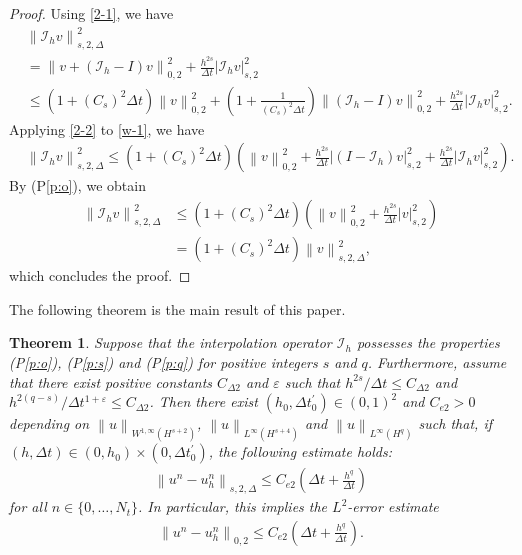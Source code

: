 \documentclass[10pt,a4paper,tbtags,leqno]{amsart}
\newtheorem{theorem}{Theorem}[section]
\theoremstyle{definition}
\numberwithin{equation}{section}
\def\norm#1#2{\left\|#2\right\|_{#1}}
\def\snorm#1#2{\left|#2\right|_{#1}}
\begin{document}
\begin{proof} 
  Using \eqref{2-1}, we have 
  \begin{align} 
    & \norm{s, 2, \Delta}{\mathcal{I}_{h} v}^2 \\ & = \norm{0, 2}{v + (\mathcal{I}_{h} - I) v}^2 + \frac{h^{2s}}{\Delta t} \snorm{s, 2}{\mathcal{I}_{h} v}^2 \\ 
    & \leq (1 + (C_s)^2 \Delta t) \norm{0, 2}{v}^2 + \left(1 + \frac{1}{(C_s)^2 \Delta t}\right) \norm{0, 2}{(\mathcal{I}_{h} - I) v}^2 + \frac{h^{2s}}{\Delta t} \snorm{s, 2}{\mathcal{I}_{h} v}^2. \label{w-1} 
  \end{align} 
  Applying \eqref{2-2} to \eqref{w-1}, we have 
  \begin{align} 
    & \norm{s, 2, \Delta}{\mathcal{I}_{h} v}^2 \leq (1 + (C_s)^2 \Delta t)\left(\norm{0, 2}{v}^2 + \frac{h^{2s}}{\Delta t} \snorm{s, 2}{(I - \mathcal{I}_{h})v}^2 + \frac{h^{2s}}{\Delta t} \snorm{s, 2}{\mathcal{I}_{h} v}^2\right). 
  \end{align} 
  By (P\ref{p:o}), we obtain 
  \begin{align} 
    \norm{s, 2, \Delta}{\mathcal{I}_{h} v}^2 & \leq (1 + (C_s)^2 \Delta t) \left(\norm{0, 2}{v}^2 + \frac{h^{2s}}{\Delta t} \snorm{s, 2}{v}^2\right) \\ & = (1 + (C_s)^2 \Delta t)  \norm{s, 2, \Delta}{v}^2, 
  \end{align}
  which concludes the proof. 
\end{proof} 

The following theorem is the main result of this paper. 

\begin{theorem} \label{thm:2} 
  Suppose that the interpolation operator $ \mathcal{I}_{h} $ possesses the properties (P\ref{p:o}), (P\ref{p:s}) and (P\ref{p:q}) for positive integers $ s $ and $ q $. 
  Furthermore, assume that there exist positive constants $ C_{\Delta 2} $ and $ \varepsilon $ such that $ h^{2s} / \Delta t \leq C_{\Delta 2} $ and $ h^{2(q - s)} / \Delta t^{1 + \varepsilon} \leq C_{\Delta 2} $. Then there exist $ (h_0, \Delta t_0^\prime) \in (0, 1)^2 $ and $ C_{e2} > 0 $ depending on $ \norm{W^{1,\infty}(H^{s + 2})}{u} $, $ \norm{L^{\infty} (H^{s + 4})}{u} $ and $ \norm{L^{\infty}(H^{q})}{u} $ such that, if $ (h, \Delta t) \in (0, h_0) \times (0, \Delta t_0^\prime) $, the following estimate holds: 
  \begin{align} 
    \norm{s, 2, \Delta}{u^n - u_h^n} \leq C_{e2} \left(\Delta t + \frac{h^q}{\Delta t}\right) \label{b26} 
  \end{align} 
  for all $ n \in \{0, \ldots, N_t\} $. 
  In particular, this implies the $ L^2 $-error estimate 
  \begin{align} 
    \norm{0,2}{u^n - u_h^n} \leq C_{e2} \left(\Delta t + \frac{h^q}{\Delta t}\right). \label{b26-2}
  \end{align} 
\end{theorem} 
\end{document}
